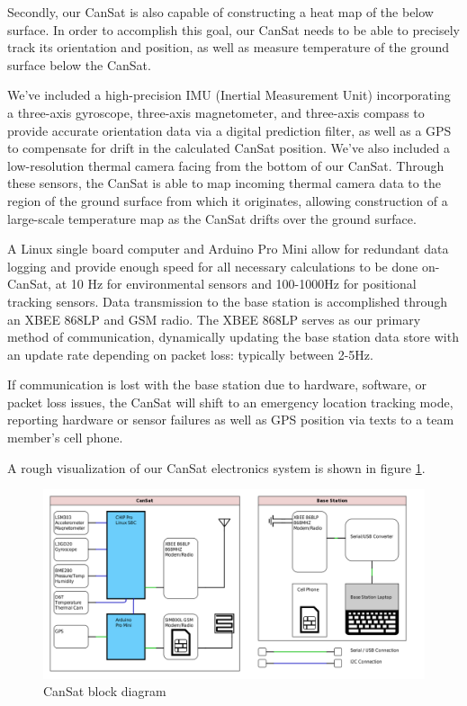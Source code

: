 \documentclass[]{report}
\begin{document}
Secondly, our CanSat is also capable of constructing a heat map of the below surface. In order to accomplish this goal, our CanSat needs to be able to precisely track its orientation and position, as well as measure temperature of the ground surface below the CanSat.

We've included a high-precision IMU (Inertial Measurement Unit) incorporating a three-axis gyroscope, three-axis magnetometer, and three-axis compass to provide accurate orientation data via a digital prediction filter, as well as a GPS to compensate for drift in the calculated CanSat position. We've also included a low-resolution thermal camera facing from the bottom of our CanSat. Through these sensors, the CanSat is able to map incoming thermal camera data to the region of the ground surface from which it originates, allowing construction of a large-scale temperature map as the CanSat drifts over the ground surface.

A Linux single board computer and Arduino Pro Mini allow for redundant data logging and provide enough speed for all necessary calculations to be done on-CanSat, at 10 Hz for environmental sensors and 100-1000Hz for positional tracking sensors.
Data transmission to the base station is accomplished through an XBEE 868LP and GSM radio. The XBEE 868LP serves as our primary method of communication, dynamically updating the base station data store with an update rate depending on packet loss: typically between 2-5Hz.

If communication is lost with the base station due to hardware, software, or packet loss issues, the CanSat will shift to an emergency location tracking mode, reporting hardware or sensor failures as well as GPS position via texts to a team member's cell phone.

A rough visualization of our CanSat electronics system is shown in figure \ref{bdiagram}.

\begin{figure}[h]
	\hfill\includegraphics[scale=0.4]{Block_Diagram.png}\hspace*{\fill}
	\caption{CanSat block diagram}
	\label{bdiagram}
\end{figure}
\end{document}
